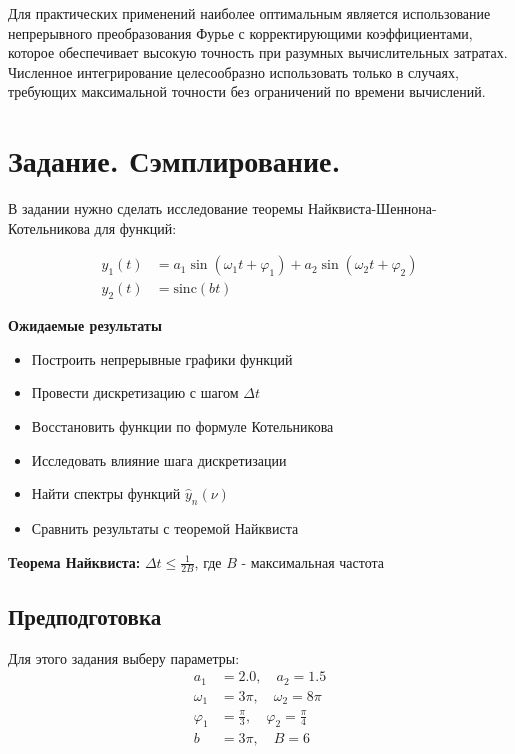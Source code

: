 \documentclass[a4paper,12pt]{article}
\begin{document}
Для практических применений наиболее оптимальным является использование непрерывного преобразования Фурье с корректирующими коэффициентами, которое обеспечивает высокую точность при разумных вычислительных затратах. Численное интегрирование целесообразно использовать только в случаях, требующих максимальной точности без ограничений по времени вычислений.

\newpage

\section{Задание. Сэмплирование.}

В задании нужно сделать исследование теоремы Найквиста-Шеннона-Котельникова для функций:

\begin{align*}
y_1(t) &= a_1 \sin(\omega_1 t + \varphi_1) + a_2 \sin(\omega_2 t + \varphi_2) \\
y_2(t) &= \text{sinc}(bt)
\end{align*}


\textbf{Ожидаемые результаты}
\begin{itemize}
	\item Построить непрерывные графики функций
	\item Провести дискретизацию с шагом $\Delta t$
	\item Восстановить функции по формуле Котельникова
	\item Исследовать влияние шага дискретизации
	\item Найти спектры функций $\hat{y}_n(\nu)$
	\item Сравнить результаты с теоремой Найквиста
\end{itemize}

\textbf{Теорема Найквиста:} $\Delta t \leq \frac{1}{2B}$, где $B$ - максимальная частота

\subsection{Предподготовка}

Для этого задания выберу параметры:
\begin{align*}
a_1 &= 2.0, \quad a_2 = 1.5 \\
\omega_1 &= 3\pi, \quad \omega_2 = 8\pi \\
\varphi_1 &= \frac{\pi}{3}, \quad \varphi_2 = \frac{\pi}{4} \\
b &= 3\pi, \quad B = 6
\end{align*}
\end{document}
